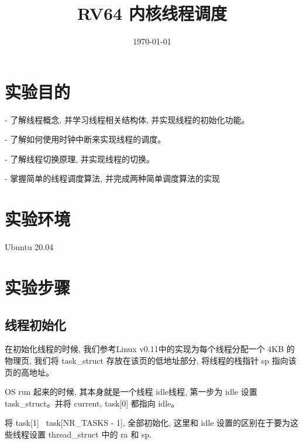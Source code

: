 \documentclass{source/Report}
\title{RV64 内核线程调度}
\date{\today}
\begin{document}
\makecover
\makeheader
\section{实验目的}
- 了解线程概念, 并学习线程相关结构体, 并实现线程的初始化功能。

- 了解如何使用时钟中断来实现线程的调度。

- 了解线程切换原理, 并实现线程的切换。

- 掌握简单的线程调度算法, 并完成两种简单调度算法的实现

\section{实验环境}
Ubuntu 20.04

\section{实验步骤}
\subsection{线程初始化}

在初始化线程的时候, 我们参考Linux v0.11中的实现为每个线程分配一个 4KB 的物理页, 我们将 task\_struct 存放在该页的低地址部分,  将线程的栈指针 sp 指向该页的高地址。    

OS run 起来的时候, 其本身就是一个线程 idle线程, 第一步为 idle 设置 task\_struct。并将 current, task[0] 都指向 idle。

将 task[1]~ task[NR\_TASKS - 1], 全部初始化,  这里和 idle 设置的区别在于要为这些线程设置 thread\_struct 中的 ra 和 sp.
\end{document}
